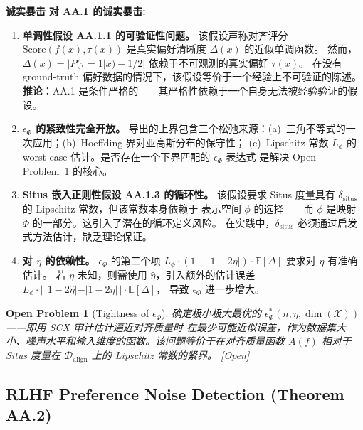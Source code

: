 \documentclass[12pt,a4paper]{article}
\newtheorem{openproblem}[theorem]{Open Problem}
\newcommand{\openquest}{\textcolor{red!70!black}{\small\textsf{[Open]}}}
\newcommand{\critique}{\medskip\noindent\textbf{诚实暴击}\quad}
\newcommand{\E}{\mathbb{E}}
\newcommand{\cX}{\mathcal{X}}
\newcommand{\cD}{\mathcal{D}}
\begin{document}
\critique
\textbf{对 AA.1 的诚实暴击:}

\begin{enumerate}
    \item \textbf{单调性假设 AA.1.1 的可验证性问题。}
    该假设声称对齐评分 $\mathrm{Score}(f(x),\tau(x))$ 是真实偏好清晰度 $\Delta(x)$ 的近似单调函数。
    然而，$\Delta(x) = |P(\tau=1|x) - 1/2|$ 依赖于不可观测的真实偏好 $\tau(x)$。
    在没有 ground-truth 偏好数据的情况下，该假设等价于一个经验上不可验证的陈述。
    \textbf{推论}：AA.1 是条件严格的——其严格性依赖于一个自身无法被经验验证的假设。
    \item \textbf{$\epsilon_\Phi$ 的紧致性完全开放。}
    导出的上界包含三个松弛来源：(a)~三角不等式的一次应用；(b)~Hoeffding 界对亚高斯分布的保守性；
    (c)~Lipschitz 常数 $L_\phi$ 的 worst-case 估计。是否存在一个下界匹配的 $\epsilon_\Phi$ 表达式
    是解决 Open Problem~\ref{prob:epsilon-phi} 的核心。
    \item \textbf{Situs 嵌入正则性假设 AA.1.3 的循环性。}
    该假设要求 Situs 度量具有 $\delta_{\mathrm{situs}}$ 的 Lipschitz 常数，但该常数本身依赖于
    表示空间 $\phi$ 的选择——而 $\phi$ 是映射 $\Phi$ 的一部分。这引入了潜在的循环定义风险。
    在实践中，$\delta_{\mathrm{situs}}$ 必须通过启发式方法估计，缺乏理论保证。
    \item \textbf{对 $\eta$ 的依赖性。}
    $\epsilon_\Phi$ 的第二个项 $L_\phi \cdot (1-|1-2\eta|) \cdot \E[\Delta]$ 要求对 $\eta$ 有准确估计。
    若 $\eta$ 未知，则需使用 $\hat{\eta}$，引入额外的估计误差 $L_\phi \cdot |\,|1-2\hat{\eta}| - |1-2\eta|\,| \cdot \E[\Delta]$，
    导致 $\epsilon_\Phi$ 进一步增大。
\end{enumerate}

\begin{openproblem}[Tightness of $\epsilon_\Phi$]
\label{prob:epsilon-phi}
确定极小极大最优的 $\epsilon_\Phi^*(n,\eta,\dim(\cX))$——即用 SCX 审计估计逼近对齐质量时
在最少可能近似误差，作为数据集大小、噪声水平和输入维度的函数。该问题等价于在对齐质量函数
$A(f)$ 相对于 Situs 度量在 $\cD_{\mathrm{align}}$ 上的 Lipschitz 常数的紧界。
\openquest
\end{openproblem}

\subsection{RLHF Preference Noise Detection (Theorem AA.2)}
\end{document}
